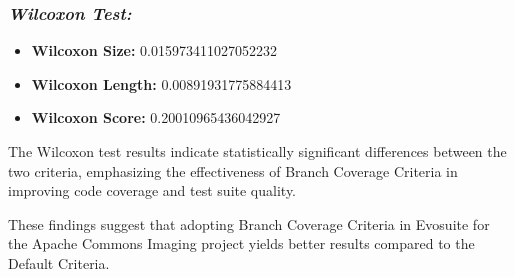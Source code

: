 \documentclass[sigconf]{acmart}
\begin{document}
\subsubsection{\textit{Wilcoxon Test:}}
\begin{itemize}
    \item \textbf{Wilcoxon Size:} 0.015973411027052232
    \item \textbf{Wilcoxon Length:} 0.00891931775884413
    \item \textbf{Wilcoxon Score:} 0.20010965436042927
\end{itemize}

The Wilcoxon test results indicate statistically significant differences between the two criteria, emphasizing the effectiveness of Branch Coverage Criteria in improving code coverage and test suite quality.

These findings suggest that adopting Branch Coverage Criteria in Evosuite for the Apache Commons Imaging project yields better results compared to the Default Criteria.
\end{document}
